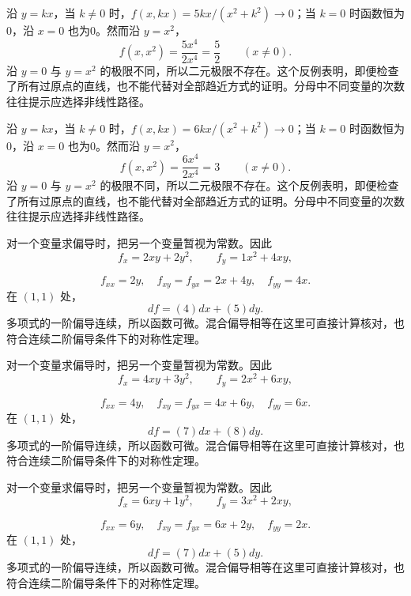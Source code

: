 \documentclass[12pt,fontset=fandol]{ctexart}
\begin{document}
\begin{solve}\label{ans:c32q12}
沿 $y=kx$，当 $k\ne0$ 时，$f(x,kx)=5kx/(x^2+k^2)\to0$；当 $k=0$ 时函数恒为0，沿 $x=0$ 也为0。然而沿 $y=x^2$，
\[
f(x,x^2)=\frac{5x^4}{2x^4}=\frac{5}{2}\qquad(x\ne0).
\]
沿 $y=0$ 与 $y=x^2$ 的极限不同，所以二元极限不存在。这个反例表明，即便检查了所有过原点的直线，也不能代替对全部趋近方式的证明。分母中不同变量的次数往往提示应选择非线性路径。
\end{solve}

\begin{solve}\label{ans:c32q13}
沿 $y=kx$，当 $k\ne0$ 时，$f(x,kx)=6kx/(x^2+k^2)\to0$；当 $k=0$ 时函数恒为0，沿 $x=0$ 也为0。然而沿 $y=x^2$，
\[
f(x,x^2)=\frac{6x^4}{2x^4}=3\qquad(x\ne0).
\]
沿 $y=0$ 与 $y=x^2$ 的极限不同，所以二元极限不存在。这个反例表明，即便检查了所有过原点的直线，也不能代替对全部趋近方式的证明。分母中不同变量的次数往往提示应选择非线性路径。
\end{solve}

\begin{solve}\label{ans:c32q14}
对一个变量求偏导时，把另一个变量暂视为常数。因此
\[
f_x=2xy+2y^2,\qquad f_y=1x^2+4xy,
\]

\[
f_{xx}=2y,\quad f_{xy}=f_{yx}=2x+4y,\quad f_{yy}=4x.
\]
在 $(1,1)$ 处，
\[
df=(4)dx+(5)dy.
\]
多项式的一阶偏导连续，所以函数可微。混合偏导相等在这里可直接计算核对，也符合连续二阶偏导条件下的对称性定理。
\end{solve}

\begin{solve}\label{ans:c32q15}
对一个变量求偏导时，把另一个变量暂视为常数。因此
\[
f_x=4xy+3y^2,\qquad f_y=2x^2+6xy,
\]

\[
f_{xx}=4y,\quad f_{xy}=f_{yx}=4x+6y,\quad f_{yy}=6x.
\]
在 $(1,1)$ 处，
\[
df=(7)dx+(8)dy.
\]
多项式的一阶偏导连续，所以函数可微。混合偏导相等在这里可直接计算核对，也符合连续二阶偏导条件下的对称性定理。
\end{solve}

\begin{solve}\label{ans:c32q16}
对一个变量求偏导时，把另一个变量暂视为常数。因此
\[
f_x=6xy+1y^2,\qquad f_y=3x^2+2xy,
\]

\[
f_{xx}=6y,\quad f_{xy}=f_{yx}=6x+2y,\quad f_{yy}=2x.
\]
在 $(1,1)$ 处，
\[
df=(7)dx+(5)dy.
\]
多项式的一阶偏导连续，所以函数可微。混合偏导相等在这里可直接计算核对，也符合连续二阶偏导条件下的对称性定理。
\end{solve}
\end{document}
